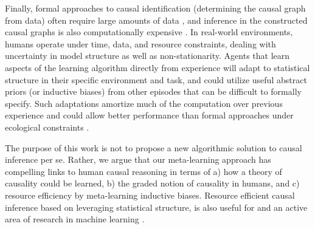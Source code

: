 Finally, formal approaches to causal identification (determining the causal graph from data) often require large amounts of data \citep{geiger1990identifying,spirtes2000causation,verma1991equivalence}, and inference in the constructed causal graphs is also computationally expensive \citep{jordan2002graphical}. In real-world environments, humans operate under time, data, and resource constraints, dealing with uncertainty in model structure as well as non-stationarity. Agents that learn aspects of the learning algorithm directly from experience will adapt to statistical structure in their specific environment and task, and could utilize useful abstract priors (or inductive biases) from other episodes that can be difficult to formally specify. Such adaptations amortize much of the computation over previous experience and could allow better performance than formal approaches under ecological constraints \citep[e.g.][]{Dasgupta644534,gershman2015computational,gigerenzer2009homo,lieder2017strategy,todd2007environments}.   

The purpose of this work is not to propose a new algorithmic solution to causal inference per se. Rather, we argue that our meta-learning approach has compelling links to human causal reasoning in terms of a) how a theory of causality could be learned, b) the graded notion of causality in humans, and c) resource efficiency by meta-learning inductive biases. Resource efficient causal inference based on leveraging statistical structure, is also useful for and an active area of research in machine learning \citep[e.g.][]{bengio2019meta, heckerman1995learning,magliacane2018domain,parascandolo2017learning,mitrovic2018causal}.




